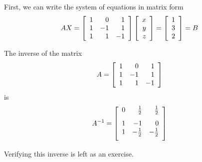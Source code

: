 \begin{solution} First, we can write the system of equations in matrix form
\begin{equation}
AX = 
\left[
\begin{array}{rrr}
1 & 0 & 1 \\
1 & -1 & 1 \\
1 & 1 & -1
\end{array}
\right] \left[
\begin{array}{r}
x \\
y \\
z
\end{array}
\right] =\left[
\begin{array}{r}
1 \\
3 \\
2
\end{array}
\right]  = B  \label{inversesystem1}
\end{equation}

The inverse of the matrix 
\begin{equation*}
A = \left[
\begin{array}{rrr}
1 & 0 & 1 \\
1 & -1 & 1 \\
1 & 1 & -1
\end{array}
\right]
\end{equation*}
is
\begin{equation*}
A^{-1} = \leftB
\begin{array}{rrr}
0 & \vspace{0.05in}\frac{1}{2} & \vspace{0.05in}\frac{1}{2} \\
1 & -1 & 0 \\
1 & -\vspace{0.05in}\frac{1}{2} & -\vspace{0.05in}\frac{1}{2}
\end{array}
\rightB
\end{equation*}

Verifying this inverse is left as an exercise.


\end{solution}
